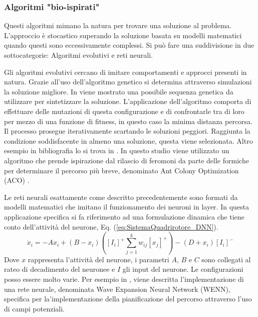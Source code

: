 \subsubsection{Algoritmi "bio-ispirati"}
Questi algoritmi mimano la natura per trovare una soluzione al problema. L'approccio è stocastico superando la soluzione basata su modelli matematici quando questi sono eccessivamente complessi.
Si può fare una suddivisione in due sottocategorie: Algoritmi evolutivi e reti neurali.

Gli algoritmi evolutivi cercano di imitare comportamenti e approcci presenti in natura. Grazie all'uso dell'algoritmo genetico si determina attraverso simulazioni la soluzione migliore. In \cite{6564703} viene mostrato una possibile sequenza genetica da utilizzare per sintetizzare  la soluzione. L'applicazione dell'algoritmo comporta di effettuare delle mutazioni di questa configurazione e di confrontarle tra di loro per mezzo di una funzione di fitness, in questo caso la minima distanza percorsa. Il processo prosegue iterativamente scartando le soluzioni peggiori. Raggiunta la condizione soddisfacente in almeno una soluzione, questa viene selezionata.
Altro esempio in bibliografia lo si trova in \cite{DuanHaibin2010Tppf}. In questo studio viene utilizzato un algoritmo che prende ispirazione dal rilascio di feromoni da parte delle formiche per determinare il percorso più breve, denominato Ant Colony Optimization (ACO) .

Le reti neurali esattamente come descritto precedentemente sono formati da modelli matematici che imitano il funzionamento dei neuroni in layer. In questa applicazione specifica si fa riferimento ad una formulazione dinamica che tiene conto dell'attività del neurone, Eq. (\ref{eq:SistemaQuadrirotore_DNN}).
\begin{equation}\label{eq:SistemaQuadrirotore_DNN}
	\dot{x}_i = -A x_i + (B -x_i) \left([I_i]^+ \sum_{j=1}^{k}w_{ij}[x_j]^+ \right) - (D + x_i) [I_i]^-
\end{equation}
Dove $x$ rappresenta l'attività del neurone, i parametri $A$, $B$ e $C$ sono collegati al rateo di decadimento del neuronee e $I$ gli input del neurone.
Le configurazioni posso essere molto varie. Per esempio in \cite{KassimA.A1992Anna}, viene descritta l'implementazione di una rete neurale, denominata Wave Expansion Neural Network (WENN), specifica per la'implementazione della pianificazione del percorso attraverso l'uso di campi potenziali. 



